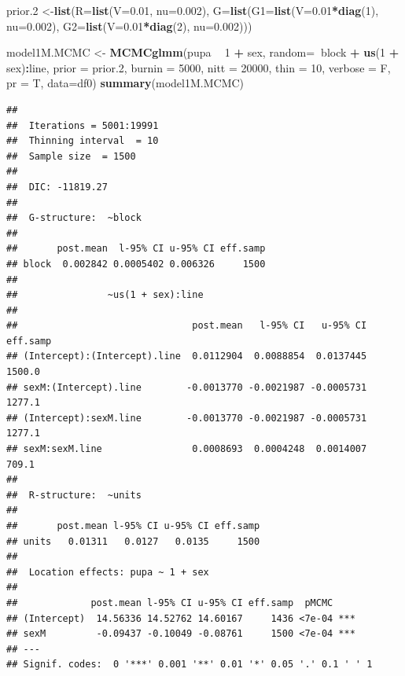 \documentclass[
]{article}
\newenvironment{Shaded}{\begin{snugshade}}{\end{snugshade}}
\newcommand{\DataTypeTok}[1]{\textcolor[rgb]{0.13,0.29,0.53}{#1}}
\newcommand{\DecValTok}[1]{\textcolor[rgb]{0.00,0.00,0.81}{#1}}
\newcommand{\FloatTok}[1]{\textcolor[rgb]{0.00,0.00,0.81}{#1}}
\newcommand{\KeywordTok}[1]{\textcolor[rgb]{0.13,0.29,0.53}{\textbf{#1}}}
\newcommand{\NormalTok}[1]{#1}
\newcommand{\OperatorTok}[1]{\textcolor[rgb]{0.81,0.36,0.00}{\textbf{#1}}}
\newcommand{\StringTok}[1]{\textcolor[rgb]{0.31,0.60,0.02}{#1}}
\begin{document}
\begin{Shaded}
\begin{Highlighting}[]
\NormalTok{prior}\FloatTok{.2}\NormalTok{ <-}\KeywordTok{list}\NormalTok{(}\DataTypeTok{R=}\KeywordTok{list}\NormalTok{(}\DataTypeTok{V=}\FloatTok{0.01}\NormalTok{, }\DataTypeTok{nu=}\FloatTok{0.002}\NormalTok{), }
               \DataTypeTok{G=}\KeywordTok{list}\NormalTok{(}\DataTypeTok{G1=}\KeywordTok{list}\NormalTok{(}\DataTypeTok{V=}\FloatTok{0.01}\OperatorTok{*}\KeywordTok{diag}\NormalTok{(}\DecValTok{1}\NormalTok{), }\DataTypeTok{nu=}\FloatTok{0.002}\NormalTok{),}
                      \DataTypeTok{G2=}\KeywordTok{list}\NormalTok{(}\DataTypeTok{V=}\FloatTok{0.01}\OperatorTok{*}\KeywordTok{diag}\NormalTok{(}\DecValTok{2}\NormalTok{), }\DataTypeTok{nu=}\FloatTok{0.002}\NormalTok{)))}

\NormalTok{model1M.MCMC <-}\StringTok{ }\KeywordTok{MCMCglmm}\NormalTok{(pupa }\OperatorTok{~}\StringTok{ }\DecValTok{1} \OperatorTok{+}\StringTok{ }\NormalTok{sex, }
  \DataTypeTok{random=}\OperatorTok{~}\NormalTok{block }\OperatorTok{+}\StringTok{ }\KeywordTok{us}\NormalTok{(}\DecValTok{1} \OperatorTok{+}\StringTok{ }\NormalTok{sex)}\OperatorTok{:}\NormalTok{line,}
  \DataTypeTok{prior =}\NormalTok{ prior}\FloatTok{.2}\NormalTok{, }\DataTypeTok{burnin =} \DecValTok{5000}\NormalTok{, }\DataTypeTok{nitt =} \DecValTok{20000}\NormalTok{, }\DataTypeTok{thin =} \DecValTok{10}\NormalTok{,}
  \DataTypeTok{verbose =}\NormalTok{ F, }\DataTypeTok{pr =}\NormalTok{ T,}
  \DataTypeTok{data=}\NormalTok{df0)}
\KeywordTok{summary}\NormalTok{(model1M.MCMC)}
\end{Highlighting}
\end{Shaded}

\begin{verbatim}
## 
##  Iterations = 5001:19991
##  Thinning interval  = 10
##  Sample size  = 1500 
## 
##  DIC: -11819.27 
## 
##  G-structure:  ~block
## 
##       post.mean  l-95% CI u-95% CI eff.samp
## block  0.002842 0.0005402 0.006326     1500
## 
##                ~us(1 + sex):line
## 
##                               post.mean   l-95% CI   u-95% CI eff.samp
## (Intercept):(Intercept).line  0.0112904  0.0088854  0.0137445   1500.0
## sexM:(Intercept).line        -0.0013770 -0.0021987 -0.0005731   1277.1
## (Intercept):sexM.line        -0.0013770 -0.0021987 -0.0005731   1277.1
## sexM:sexM.line                0.0008693  0.0004248  0.0014007    709.1
## 
##  R-structure:  ~units
## 
##       post.mean l-95% CI u-95% CI eff.samp
## units   0.01311   0.0127   0.0135     1500
## 
##  Location effects: pupa ~ 1 + sex 
## 
##             post.mean l-95% CI u-95% CI eff.samp  pMCMC    
## (Intercept)  14.56336 14.52762 14.60167     1436 <7e-04 ***
## sexM         -0.09437 -0.10049 -0.08761     1500 <7e-04 ***
## ---
## Signif. codes:  0 '***' 0.001 '**' 0.01 '*' 0.05 '.' 0.1 ' ' 1
\end{verbatim}
\end{document}
